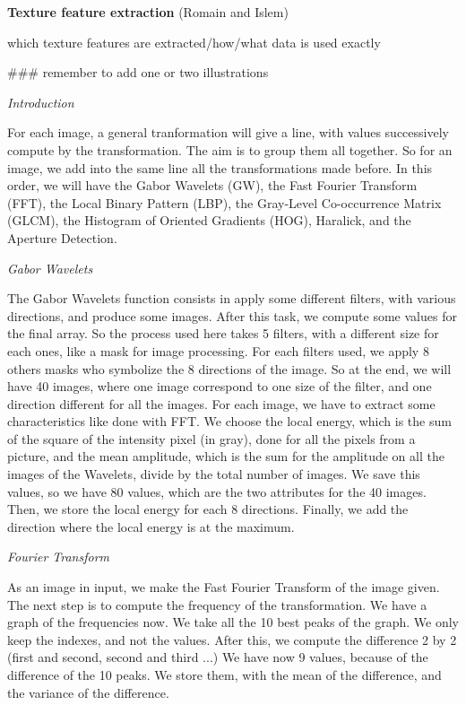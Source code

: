 \textbf{Texture feature extraction} (Romain and Islem)

which texture features are extracted/how/what data is used exactly

### remember to add one or two illustrations 

    \textit{Introduction}
    
For each image, a general tranformation will give a line, with values successively compute by the transformation. The aim is to group them all together. So for an image, we add into the same line all the transformations made before. In this order, we will have the Gabor Wavelets (GW), the Fast Fourier Transform (FFT), the Local Binary Pattern (LBP), the Gray-Level Co-occurrence Matrix (GLCM), the Histogram of Oriented Gradients (HOG), Haralick, and the Aperture Detection.

    \textit{Gabor Wavelets}

The Gabor Wavelets function consists in apply some different filters, with various directions, and produce some images. After this task, we compute some values for the final array. So the process used here takes 5 filters, with a different size for each ones, like a mask for image processing. For each filters used, we apply 8 others masks who symbolize the 8 directions of the image. So at the end, we will have 40 images, where one image correspond to one size of the filter, and one direction different for all the images. For each image, we have to extract some characteristics like done with FFT. We choose the local energy, which is the sum of the square of the intensity pixel (in gray), done for all the pixels from a picture, and the mean amplitude, which is the sum for the amplitude on all the images of the Wavelets, divide by the total number of images. We save this values, so we have 80 values, which are the two attributes for the 40 images. Then, we store the local energy for each 8 directions. Finally, we add the direction where the local energy is at the maximum.

    \textit{Fourier Transform}

As an image in input, we make the Fast Fourier Transform of the image given. The next step is to compute the frequency of the transformation. We have a graph of the frequencies now. We take all the 10 best peaks of the graph. We only keep the indexes, and not the values. After this, we compute the difference 2 by 2 (first and second, second and third ...) We have now 9 values, because of the difference of the 10 peaks. We store them, with the mean of the difference, and the variance of the difference.
    
    
    
    
    